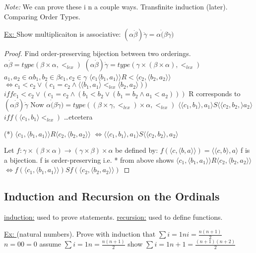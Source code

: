 \documentclass{article}
\begin{document}
    \emph{Note:} We can prove these i n a couple ways.
    Transfinite induction (later).
    Comparing Order Types.

    \underline{Ex: } Show multiplicaiton is associative:
    $ (\alpha \dot \beta) \dot \gamma = \alpha \dot (\beta \dot \gamma)$
    \begin{proof}
        Find order-preserving bijection between two orderings.
        $\alpha \dot \beta = type(\beta \times \alpha, <_{lex})$
        $(\alpha \dot \beta) \dot \gamma = type(\gamma \times (\beta \times \alpha), <_{lex})$
        $a_1, a_2 \in \alpha b_1, b_2 \in \beta c_1,c_2 \in \gamma$
        $\langle c_1 \langle b_1, a_1 \rangle \rangle R < \langle c_2, \langle b_2,a_2 \rangle \rangle$
        $\iff c_1 < c_2 \vee ( c_1 = c_2 \wedge \langle \langle b_1, a_1 \rangle <_{lex} \langle b_2, a_2 \rangle ))$
        $iff c_1 < c_2 \vee ( c_1 = c_2 \wedge (b_1 < b_2 \vee (b_1 = b_2 \wedge a_1 < a_2)))$
        R corresponds to $(\alpha \dot \beta) \dot \gamma$
        Now $\alpha \dot (\beta \dot \gamma) = type ((\beta \times \gamma, <_{lex})\times \alpha, <_{lex})$
        $\langle \langle c_1,b_1\rangle,a_1\rangle S \langle\langle c_2,b_2,\rangle a_2\rangle$
        $iff (\langle c_1,b_1\rangle <_{lex})$ \dots etcetera

        (*) $\langle c_1,\langle b_1, a_1 \rangle \rangle R \langle c_2, \langle b_2, a_2 \rangle \rangle$
        $\iff \langle \langle c_1, b_1 \rangle , a_1 \rangle S \langle \langle c_2, b_2 \rangle , a_2 \rangle$

        Let $f : \gamma \times (\beta \times \alpha) \rightarrow (\gamma \times \beta) \times \alpha$
        be defined by:
        $f(\langle c, \langle b, a \rangle \rangle) = \langle \langle c, b \rangle , a \rangle$
        f is a bijection.
        f is order-preserving i.e. * from above
        shows $\langle c_1, \langle b_1, a_1 \rangle \rangle R \langle c_2, \langle b_2, a_2 \rangle \rangle$
        $\iff f(\langle c_1, \langle b_1, a_1 \rangle \rangle) S f(\langle c_2, \langle b_2, a_2 \rangle \rangle )$
    \end{proof}

    \subsection{Induction and Recursion on the Ordinals}
    \underline{induction:} used to prove statements.
    \underline{recursion:} used to define functions.

    \underline{Ex: } (natural numbers).
    Prove with induction that $\sum{i=1}{n} i = \frac{n(n+1)}{2}$
    $n=0 0=0$
    assume $\sum{i=1}{n} = \frac{n(n+1)}{2}$
    show $\sum{i=1}{n+1} = \frac{(n+1)(n+2)}{2}$
\end{document}
